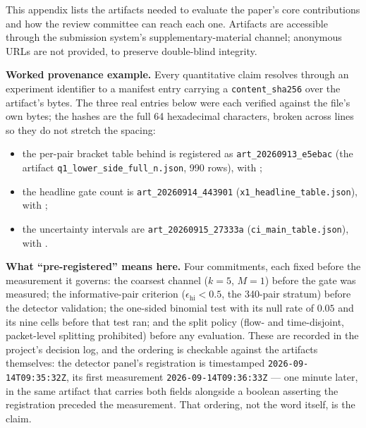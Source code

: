 \documentclass[letterpaper,twocolumn,10pt]{article}
\newcommand{\epshi}{\ensuremath{\epsilon_{\mathrm{hi}}}}
\begin{document}
This appendix lists the artifacts needed to evaluate the paper's core
contributions and how the review committee can reach each one. Artifacts are
accessible through the submission system's supplementary-material channel;
anonymous URLs are not provided, to preserve double-blind integrity.

\textbf{Worked provenance example.}
Every quantitative claim resolves through an experiment identifier to a manifest
entry carrying a \texttt{content\_sha256} over the artifact's bytes. The three
real entries below were each verified against the file's own bytes; the hashes
are the full 64 hexadecimal characters, broken across lines so they do not
stretch the spacing:
\begin{itemize}
  \item the per-pair bracket table behind  is registered as
  \texttt{art\_20260913\_e5ebac} (the artifact
  \texttt{q1\_lower\_side\_full\_n.json}, 990 rows), with
  \texttt{};
  \item the headline gate count is \texttt{art\_20260914\_443901}
  (\texttt{x1\_headline\_table.json}), with
  \texttt{};
  \item the uncertainty intervals are \texttt{art\_20260915\_27333a}
  (\texttt{ci\_main\_table.json}), with
  \texttt{}.
\end{itemize}

\textbf{What ``pre-registered'' means here.}
Four commitments, each fixed before the measurement it governs: the coarsest
channel ($k{=}5$, $M{=}1$) before the gate was measured; the informative-pair
criterion ($\epshi < 0.5$, the 340-pair stratum) before the detector validation;
the one-sided binomial test with its null rate of $0.05$ and its nine cells
before that test ran; and the split policy (flow- and time-disjoint,
packet-level splitting prohibited) before any evaluation. These are recorded in
the project's decision log, and the ordering is checkable against the artifacts
themselves: the detector panel's registration is timestamped
\nolinkurl{2026-09-14T09:35:32Z}, its first measurement
\nolinkurl{2026-09-14T09:36:33Z} — one minute later, in the same artifact that
carries both fields alongside a boolean asserting the registration preceded the
measurement. That ordering, not the word itself, is the claim.
\end{document}
